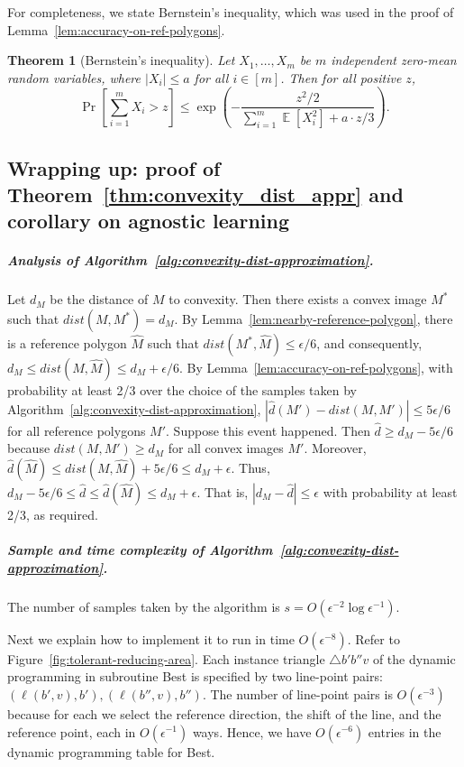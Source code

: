 \documentclass[11pt,english]{article}
\newtheorem{theorem}{Theorem}[section]
\numberwithin{figure}{section}
\newcommand{\dis}{dist}
\newcommand{\Best}{{\sf Best}\xspace}
\DeclareMathOperator*{\E}{\mathbb E}
\newcommand{\mydelta}{\epsilon} \newcommand{\bigdelta}{{\epsilon_0}} \newcommand{\dsquares}{d_{\rm squares}}
\newcommand{\dout}{\hat{d}}
\begin{document}
For completeness, we state Bernstein's inequality, which was used in the proof of Lemma~\ref{lem:accuracy-on-ref-polygons}.

\begin{theorem}[Bernstein's inequality]\label{thm:bernstein}
 Let $X_1,\dots,X_m$ be $m$ independent zero-mean random variables, where $|X_i|\leq a$ for all $i\in [m]$. Then for all positive $z$,
$$
\Pr\left[\sum_{i = 1}^m X_i > z\right] \le \exp\left(- \frac{z^2/2 }{\sum_{i = 1}^m \E[X_i^2]+a\cdot z/3}\right) .
$$

\end{theorem}



\subsection{Wrapping up: proof of Theorem~\ref{thm:convexity_dist_appr} and corollary on agnostic learning}\label{sec:convexity-dist-approx-wrap-up}
\subparagraph{Analysis of Algorithm~\ref{alg:convexity-dist-approximation}.}
Let $d_M$ be the distance of $M$ to convexity. Then there exists a convex image $M^*$ such that $\dis(M,M^*)=d_M$.
By Lemma~\ref{lem:nearby-reference-polygon}, there is a reference polygon $\hat M$ such that $\dis(M^*,\hat M)\leq \mydelta/6$, and consequently, $d_M\leq\dis(M,\hat M)\leq d_M+\mydelta/6$.
By Lemma~\ref{lem:accuracy-on-ref-polygons},
with probability at least 2/3 over the choice of the samples taken by Algorithm~\ref{alg:convexity-dist-approximation},
$|\dout(M')-\dis(M,M')|\leq 5\mydelta/6$ for all reference polygons $M'$.
Suppose this event happened. Then $\dout\geq d_M-5\mydelta/6$ because $\dis(M,M')\geq d_M$ for all convex images $M'$. Moreover,  $\dout(\hat{M})\leq\dis(M,\hat{M})+5\mydelta/6\leq d_M+\mydelta.$ Thus,
$d_M-5\mydelta/6\leq\dout\leq\dout(\hat{M})\leq d_M+\mydelta.$ That is, $|d_M-\dout|\leq \mydelta$ with probability at least 2/3, as required.

\subparagraph{Sample and time complexity of Algorithm~\ref{alg:convexity-dist-approximation}.} The number of samples taken by the algorithm is $s=O(\mydelta^{-2}\log \mydelta^{-1})$.

Next we explain how to implement it to run in time $O(\mydelta^{-8})$. Refer to Figure~\ref{fig:tolerant-reducing-area}.
Each instance triangle $\bigtriangleup b'b''v$ of the dynamic programming in subroutine \Best is specified by two line-point pairs: $(\ell(b',v),b'),(\ell(b'',v),b'')$. The number of line-point pairs is $O(\mydelta^{-3})$ because for each we select
the reference direction, the shift of the line, and the reference point, each
in $O(\mydelta^{-1})$ ways.  Hence, we have $O(\mydelta^{-6})$ entries in the dynamic
programming table for \Best.
\end{document}
